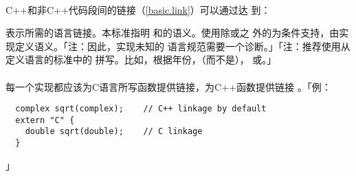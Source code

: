 \paragraph{}
C++和非C++代码段间的链接（\ref{basic.link}）可以通过达
到：


表示所需的语言链接。本标准指明
和的语义。使用除或之
外的为条件支持，由实现定义语义。「注：因此，实现未知的
语言规范需要一个诊断。」「注：推荐使用从定义语言的标准中的
拼写。比如，根据年份，（而不是），
或。」

\paragraph{}
每一个实现都应该为C语言所写函数提供链接，为C++函数提供链接
。「例：
\begin{lstlisting}
  complex sqrt(complex);    // C++ linkage by default
  extern "C" {
    double sqrt(double);    // C linkage
  }
\end{lstlisting}」

